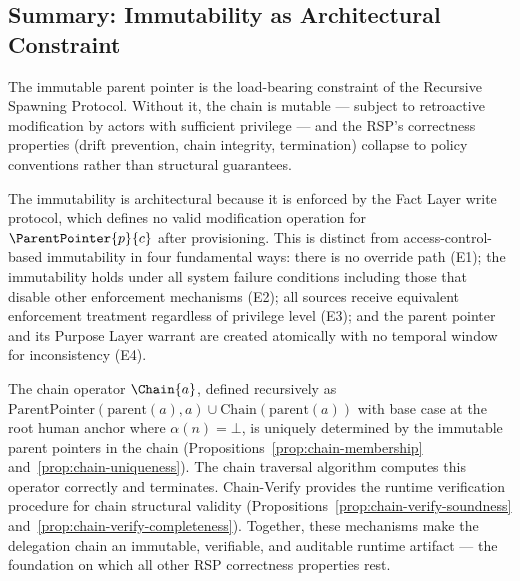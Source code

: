 \subsection{Summary: Immutability as Architectural Constraint}
\label{sec:immutability-summary}

The immutable parent pointer is the load-bearing constraint of the Recursive Spawning Protocol. Without it, the chain is mutable --- subject to retroactive modification by actors with sufficient privilege --- and the RSP's correctness properties (drift prevention, chain integrity, termination) collapse to policy conventions rather than structural guarantees.

The immutability is architectural because it is enforced by the Fact Layer write protocol, which defines no valid modification operation for $\ParentPointer{p}{c}$ after provisioning. This is distinct from access-control-based immutability in four fundamental ways: there is no override path (E1); the immutability holds under all system failure conditions including those that disable other enforcement mechanisms (E2); all sources receive equivalent enforcement treatment regardless of privilege level (E3); and the parent pointer and its Purpose Layer warrant are created atomically with no temporal window for inconsistency (E4).

The chain operator $\Chain{a}$, defined recursively as $\mathrm{ParentPointer}(\mathrm{parent}(a), a) \cup \mathrm{Chain}(\mathrm{parent}(a))$ with base case at the root human anchor where $\alpha(n) = \bot$, is uniquely determined by the immutable parent pointers in the chain (Propositions~\ref{prop:chain-membership} and~\ref{prop:chain-uniqueness}). The chain traversal algorithm computes this operator correctly and terminates. Chain-Verify provides the runtime verification procedure for chain structural validity (Propositions~\ref{prop:chain-verify-soundness} and~\ref{prop:chain-verify-completeness}). Together, these mechanisms make the delegation chain an immutable, verifiable, and auditable runtime artifact --- the foundation on which all other RSP correctness properties rest.

